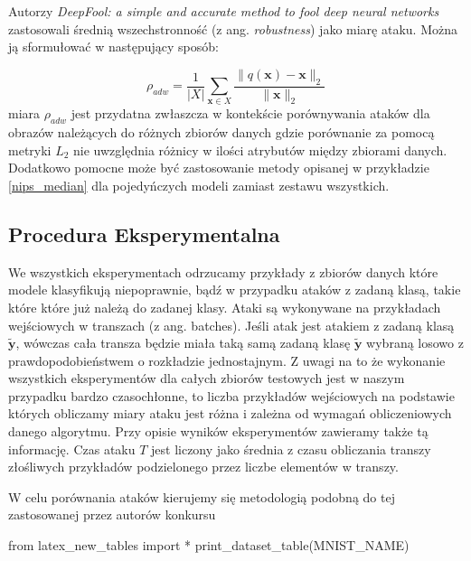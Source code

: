 \documentclass[
    left=2.5cm,         %
    right=2.5cm,        %
    top=2.5cm,          %
    bottom=3cm,         %
    bindingoffset=6mm,  %
    nohyphenation=false %
]{eiti/eiti-thesis}
\renewcommand{\vec}[1]{\mathbf{#1}}
\begin{document}
    Autorzy \textit{DeepFool: a simple and accurate method to fool deep neural networks}\cite{DBLP:journals/corr/Moosavi-Dezfooli15}
    zastosowali średnią wszechstronność (z ang. \textit{robustness}) jako miarę ataku. Można ją sformułować w następujący sposób:

    \begin{equation}
        \rho_{adw}=\frac{1}{|X|}\sum_{\vec{x} \in X} \frac{\|q(\vec{x}) - \vec{x}\|_2}{\|\vec{x}\|_2}
    \end{equation}
    miara \(\rho_{adw}\) jest przydatna zwłaszcza w kontekście porównywania ataków dla obrazów należących do
    różnych zbiorów danych gdzie porównanie za pomocą metryki \(L_2\) nie uwzględnia różnicy w ilości atrybutów między zbiorami
    danych.
    Dodatkowo pomocne może być zastosowanie metody opisanej w przykładzie \eqref{nips_median} dla pojedyńczych modeli
    zamiast zestawu wszystkich.

\subsection{Procedura Eksperymentalna}
    We wszystkich eksperymentach odrzucamy przykłady z zbiorów danych które modele klasyfikują niepoprawnie, bądź w
    przypadku ataków z zadaną klasą, takie które które już należą do zadanej klasy. Ataki są wykonywane na przykładach
    wejściowych w transzach (z ang. batches).
Jeśli atak jest atakiem z zadaną klasą $\vec{\widetilde{y}}$, wówczas
    cała transza będzie miała taką samą zadaną klasę $\vec{\widetilde{y}}$ wybraną losowo z prawdopodobieństwem o
    rozkładzie jednostajnym.
Z uwagi na to że wykonanie wszystkich eksperymentów dla całych zbiorów testowych jest w naszym przypadku bardzo czasochłonne,
to liczba przykładów wejściowych na podstawie których obliczamy miary ataku jest różna i zależna od wymagań obliczeniowych
danego algorytmu. Przy opisie wyników eksperymentów zawieramy także tą informację.
Czas ataku $T$ jest liczony jako średnia z czasu obliczania transzy złośliwych przykładów podzielonego przez liczbe
elementów w transzy.

W celu porównania ataków kierujemy się metodologią podobną do tej zastosowanej przez autorów konkursu

\begin{table}[ht]
\begin{adjustbox}{max width=\textwidth}
\begin{pycode}
from latex_new_tables import *
print_dataset_table(MNIST_NAME)
\end{pycode}
\end{adjustbox}
\end{table}
\end{document}
